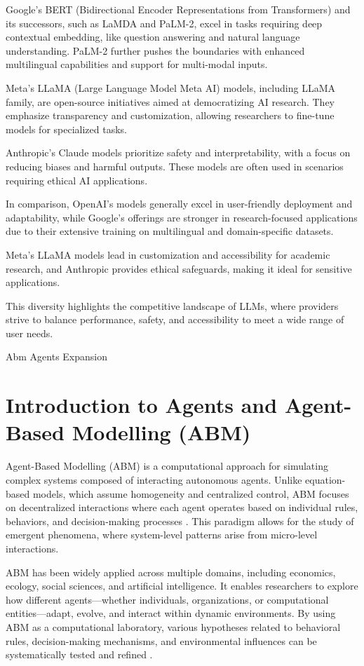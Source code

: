Google's BERT (Bidirectional Encoder Representations from Transformers) and its successors, such as LaMDA and PaLM-2, excel in tasks requiring deep contextual embedding, like question answering and natural language understanding. PaLM-2 further pushes the boundaries with enhanced multilingual capabilities and support for multi-modal inputs.

Meta's LLaMA (Large Language Model Meta AI) models, including LLaMA family, are open-source initiatives aimed at democratizing AI research. They emphasize transparency and customization, allowing researchers to fine-tune models for specialized tasks.

Anthropic’s Claude models prioritize safety and interpretability, with a focus on reducing biases and harmful outputs. These models are often used in scenarios requiring ethical AI applications.

In comparison, OpenAI's models generally excel in user-friendly deployment and adaptability, while Google's offerings are stronger in research-focused applications due to their extensive training on multilingual and domain-specific datasets.

Meta’s LLaMA models lead in customization and accessibility for academic research, and Anthropic provides ethical safeguards, making it ideal for sensitive applications.

This diversity highlights the competitive landscape of LLMs, where providers strive to balance performance, safety, and accessibility to meet a wide range of user needs.

\newpage



Abm Agents Expansion
\section{Introduction to Agents and Agent-Based Modelling (ABM)}

Agent-Based Modelling (ABM) is a computational approach for simulating complex systems composed of interacting autonomous agents. Unlike equation-based models, which assume homogeneity and centralized control, ABM focuses on decentralized interactions where each agent operates based on individual rules, behaviors, and decision-making processes \cite{janssen2005}. This paradigm allows for the study of emergent phenomena, where system-level patterns arise from micro-level interactions.

ABM has been widely applied across multiple domains, including economics, ecology, social sciences, and artificial intelligence. It enables researchers to explore how different agents—whether individuals, organizations, or computational entities—adapt, evolve, and interact within dynamic environments. By using ABM as a computational laboratory, various hypotheses related to behavioral rules, decision-making mechanisms, and environmental influences can be systematically tested and refined \cite{janssen2005}.

